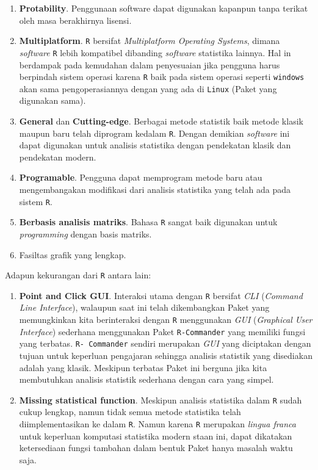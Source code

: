 \documentclass[]{book}
\providecommand{\tightlist}{%
  \setlength{\itemsep}{0pt}\setlength{\parskip}{0pt}}
\theoremstyle{definition}
\theoremstyle{definition}
\theoremstyle{definition}
\theoremstyle{remark}
\begin{document}
\begin{enumerate}
\def\labelenumi{\arabic{enumi}.}
\tightlist
\item
  \textbf{Protability}. Penggunaan software dapat digunakan kapanpun tanpa terikat oleh masa berakhirnya lisensi.
\item
  \textbf{Multiplatform}. \texttt{R} bersifat \emph{Multiplatform Operating Systems}, dimana \emph{software} \texttt{R} lebih kompatibel dibanding \emph{software} statistika lainnya. Hal in berdampak pada kemudahan dalam penyesuaian jika pengguna harus berpindah sistem operasi karena \texttt{R} baik pada sistem operasi seperti \texttt{windows} akan sama pengoperasiannya dengan yang ada di \texttt{Linux} (Paket yang digunakan sama).
\item
  \textbf{General} dan \textbf{Cutting-edge}. Berbagai metode statistik baik metode klasik maupun baru telah diprogram kedalam \texttt{R}. Dengan demikian \emph{software} ini dapat digunakan untuk analisis statistika dengan pendekatan klasik dan pendekatan modern.
\item
  \textbf{Programable}. Pengguna dapat memprogram metode baru atau mengembangakan modifikasi dari analisis statistika yang telah ada pada sistem \texttt{R}.
\item
  \textbf{Berbasis analisis matriks}. Bahasa \texttt{R} sangat baik digunakan untuk \emph{programming} dengan basis matriks.
\item
  Fasiltas grafik yang lengkap.
\end{enumerate}

Adapun kekurangan dari \texttt{R} antara lain:

\begin{enumerate}
\def\labelenumi{\arabic{enumi}.}
\tightlist
\item
  \textbf{Point and Click GUI}. Interaksi utama dengan \texttt{R} bersifat \emph{CLI} (\emph{Command Line Interface}), walaupun saat ini telah dikembangkan Paket yang memungkinkan kita berinteraksi dengan \texttt{R} menggunakan \emph{GUI} (\emph{Graphical User Interface}) sederhana menggunakan Paket \texttt{R-Commander} yang memiliki fungsi yang terbatas. \texttt{R-\ Commander} sendiri merupakan \emph{GUI} yang diciptakan dengan tujuan untuk keperluan pengajaran sehingga analisis statistik yang disediakan adalah yang klasik. Meskipun terbatas Paket ini berguna jika kita membutuhkan analisis statistik sederhana dengan cara yang simpel.
\item
  \textbf{Missing statistical function}. Meskipun analisis statistika dalam \texttt{R} sudah cukup lengkap, namun tidak semua metode statistika telah diimplementasikan ke dalam \texttt{R}. Namun karena \texttt{R} merupakan \emph{lingua franca} untuk keperluan komputasi statistika modern staan ini, dapat dikatakan ketersediaan fungsi tambahan dalam bentuk Paket hanya masalah waktu saja.
\end{enumerate}
\end{document}
